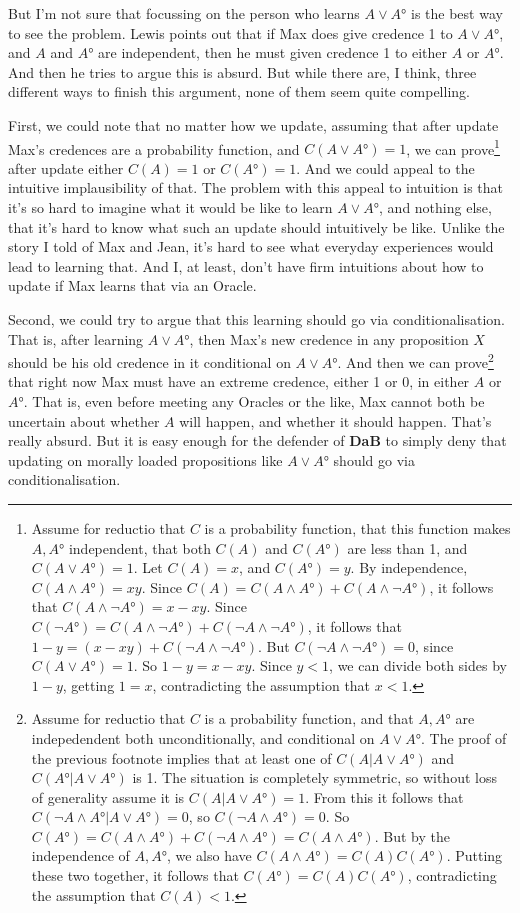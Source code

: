 \documentclass[11pt,]{book}
\let\rmarkdownfootnote\footnote%
\def\footnote{\protect\rmarkdownfootnote}
\begin{document}
But I'm not sure that focussing on the person who learns \(A \vee A°\) is the best way to see the problem. Lewis points out that if Max does give credence 1 to \(A \vee A°\), and \(A\) and \(A°\) are independent, then he must given credence 1 to either \(A\) or \(A°\). And then he tries to argue this is absurd. But while there are, I think, three different ways to finish this argument, none of them seem quite compelling.

First, we could note that no matter how we update, assuming that after update Max's credences are a probability function, and \(C(A \vee A°)=1\), we can prove\footnote{Assume for reductio that \(C\) is a probability function, that this function makes \(A, A°\) independent, that both \(C(A)\) and \(C(A°)\) are less than 1, and \(C(A \vee A°)=1\). Let \(C(A) = x\), and \(C(A°) = y\). By independence, \(C(A \wedge A°) = xy\). Since \(C(A) = C(A \wedge A°) + C(A \wedge \neg A°)\), it follows that \(C(A \wedge \neg A°) = x - xy\). Since \(C(\neg A°) = C(A \wedge \neg A°) + C(\neg A \wedge \neg A°)\), it follows that \(1-y = (x - xy) + C(\neg A \wedge \neg A°)\). But \(C(\neg A \wedge \neg A°) = 0\), since \(C(A \vee A°) = 1\). So \(1 - y = x - xy\). Since \(y < 1\), we can divide both sides by \(1-y\), getting \(1 = x\), contradicting the assumption that \(x < 1\).} after update either \(C(A) = 1\) or \(C(A°)=1\). And we could appeal to the intuitive implausibility of that. The problem with this appeal to intuition is that it's so hard to imagine what it would be like to learn \(A \vee A°\), and nothing else, that it's hard to know what such an update should intuitively be like. Unlike the story I told of Max and Jean, it's hard to see what everyday experiences would lead to learning that. And I, at least, don't have firm intuitions about how to update if Max learns that via an Oracle.

Second, we could try to argue that this learning should go via conditionalisation. That is, after learning \(A \vee A°\), then Max's new credence in any proposition \(X\) should be his old credence in it conditional on \(A \vee A°\). And then we can prove\footnote{Assume for reductio that \(C\) is a probability function, and that \(A, A°\) are indepedendent both unconditionally, and conditional on \(A \vee A°\). The proof of the previous footnote implies that at least one of \(C(A | A \vee A°)\) and \(C(A° | A \vee A°)\) is 1. The situation is completely symmetric, so without loss of generality assume it is \(C(A | A \vee A°) = 1\). From this it follows that \(C(\neg A \wedge A° | A \vee A°) = 0\), so \(C(\neg A \wedge A°) = 0\). So \(C(A°) = C(A \wedge A°) + C(\neg A \wedge A°) = C(A \wedge A°)\). But by the independence of \(A, A°\), we also have \(C(A \wedge A°) = C(A)C(A°)\). Putting these two together, it follows that \(C(A°) = C(A)C(A°)\), contradicting the assumption that \(C(A) < 1\).} that right now Max must have an extreme credence, either 1 or 0, in either \(A\) or \(A°\). That is, even before meeting any Oracles or the like, Max cannot both be uncertain about whether \(A\) will happen, and whether it should happen. That's really absurd. But it is easy enough for the defender of \textbf{DaB} to simply deny that updating on morally loaded propositions like \(A \vee A°\) should go via conditionalisation.
\end{document}
